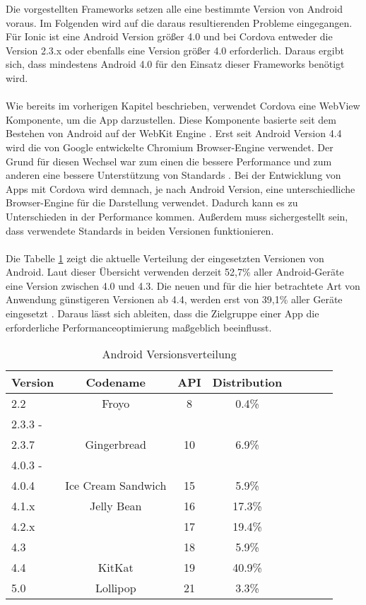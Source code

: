\label{plattformen}
Die vorgestellten Frameworks setzen alle eine bestimmte Version von Android voraus. Im Folgenden wird auf die daraus resultierenden Probleme eingegangen.
Für Ionic ist eine Android Version größer 4.0 und bei Cordova entweder die Version 2.3.x oder ebenfalls eine Version größer 4.0 erforderlich. Daraus ergibt sich, dass mindestens Android 4.0 für den Einsatz dieser Frameworks benötigt wird.
\\\\
Wie bereits im vorherigen Kapitel beschrieben, verwendet Cordova eine \gls{WebView} Komponente, um die App darzustellen. Diese Komponente basierte seit dem Bestehen von Android auf der WebKit Engine \cite{android-webview-component}. Erst seit Android Version 4.4 wird die von Google entwickelte Chromium  Browser-Engine verwendet\cite{chromium}. Der Grund für diesen Wechsel war zum einen die bessere Performance und zum anderen eine bessere Unterstützung von Standards \cite{android-migrating-webview}\cite{android-webview}. Bei der Entwicklung von Apps mit Cordova wird demnach, je nach Android Version, eine unterschiedliche Browser-Engine für die Darstellung verwendet. Dadurch kann es zu Unterschieden in der Performance kommen. Außerdem muss sichergestellt sein, dass verwendete Standards in beiden Versionen funktionieren. 
\\\\
Die Tabelle \ref{android-versionsverteilung} zeigt die aktuelle Verteilung der eingesetzten Versionen von Android. Laut dieser Übersicht verwenden derzeit 52,7\%  aller Android-Geräte eine Version zwischen 4.0 und 4.3. Die neuen und für die hier betrachtete Art von Anwendung günstigeren Versionen ab 4.4, werden erst von 39,1\% aller Geräte eingesetzt \cite{android-plattform-verteilung}. Daraus lässt sich ableiten, dass die Zielgruppe einer App die erforderliche Performanceoptimierung maßgeblich beeinflusst.
\begin{table}
	\centering
	\begin{tabular}{l*{6}{c}r}
		\textbf{Version} & \textbf{Codename} & \textbf{API} & \textbf{Distribution} \\
		\hline
		2.2 & Froyo & 8 & 0.4\% \\
		2.3.3 - \\
		2.3.7 & Gingerbread & 10 & 6.9\% \\
		4.0.3 - \\
		4.0.4 & Ice Cream Sandwich & 15 & 5.9\% \\
		4.1.x & Jelly Bean & 16 & 17.3\% \\
		4.2.x &  & 17 & 19.4\% \\
		4.3 &  & 18 & 5.9\% \\
		4.4 & KitKat & 19 & 40.9\% \\
		5.0 & Lollipop & 21 & 3.3\%
	\end{tabular}
	\caption{Android Versionsverteilung
	\cite{android-plattform-verteilung}}
	\label{android-versionsverteilung}
\end{table}
